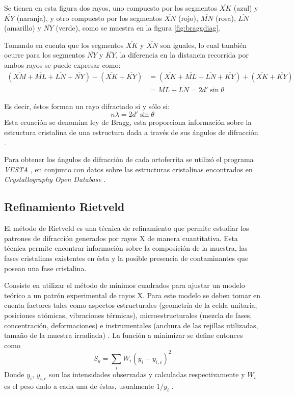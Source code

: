 \documentclass[../main.tex]{subfiles}
\begin{document}
Se tienen en esta figura dos rayos, uno compuesto por los segmentos $\overline{XK}$ (azul) y $\overline{KY}$ (naranja), y otro compuesto por los segmentos $\overline{XN}$ (rojo), $\overline{MN}$ (rosa), $\overline{LN}$ (amarillo) y $\overline{NY}$ (verde), como se muestra en la figura \ref{fig:braggdiag}.

Tomando en cuenta que los segmentos $\overline{XK}$ y $\overline{XN}$ son iguales, lo cual también ocurre para los segmentos $\overline{NY}$ y $\overline{KY}$, la diferencia en la distancia recorrida por ambos rayos se puede expresar como:
\begin{equation}
    \begin{split}
        (\overline{XM}+\overline{ML}+\overline{LN}+\overline{NY})-(\overline{XK}+\overline{KY})&=(\overline{XK}+\overline{ML}+\overline{LN}+\overline{KY})+(\overline{XK}+\overline{KY})\\
        &=\overline{ML}+\overline{LN}=2d'\sin{\theta}
    \end{split}
    \label{eq:rayosbragg}
\end{equation}

Es decir, éstos forman un rayo difractado si y sólo si:
\begin{equation}
    n\lambda=2d'\sin{\theta}
    \label{eq:leydebragg}
\end{equation}
Esta ecuación se denomina ley de Bragg, esta proporciona información sobre la estructura cristalina de una estructura dada a través de sus ángulos de difracción \cite{Cullity2014}.

Para obtener los ángulos de difracción de cada ortoferrita se utilizó el programa \textit{VESTA} \cite{VESTA}, en conjunto con datos sobre las estructuras cristalinas encontrados en \textit{Crystallography Open Database} \cite{COD}.
\subsection{Refinamiento Rietveld}
El método de Rietveld es una técnica de refinamiento que permite estudiar los patrones de difracción generados por rayos X de manera cuantitativa. Esta técnica permite encontrar información sobre la composición de la muestra, las fases cristalinas existentes en ésta y la posible presencia de contaminantes que posean una fase cristalina.

Consiste en utilizar el método de mínimos cuadrados para ajustar un modelo teórico a un patrón experimental de rayos X. Para este modelo se deben tomar en cuenta factores tales como aspectos estructurales (geometría de la celda unitaria, posiciones atómicas, vibraciones térmicas), microestructurales (mezcla de fases, concentración, deformaciones) e instrumentales (anchura de las rejillas utilizadas, tamaño de la muestra irradiada) \cite{Rietveld}. La función a minimizar se define entonces como
\begin{equation}
    S_y=\sum_i W_i\left(y_{i}-y_{i,c}\right)^2
    \label{eq:minimcuad}
\end{equation}
Donde $y_{i}$, $y_{i,c}$ son las intensidades observadas y calculadas respectivamente y $W_i$ es el peso dado a cada una de éstas, usualmente $1/y_i$ \cite{Fuentes2004}.
\end{document}
